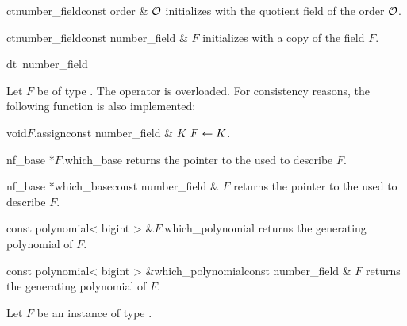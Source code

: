 \begin{fcode}{ct}{number_field}{const order & $\mathcal{O}$}
  initializes with the quotient field of the order $\mathcal{O}$.
\end{fcode}

\begin{fcode}{ct}{number_field}{const number_field & $F$}
  initializes with a copy of the field $F$.
\end{fcode}

\begin{fcode}{dt}{{~number_field}}{}
\end{fcode}



\ASGN

Let $F$ be of type .  The operator \code{=} is overloaded.  For consistency
reasons, the following function is also implemented:

\begin{fcode}{void}{$F$.assign}{const number_field & $K$}
  $F \leftarrow K$.
\end{fcode}



\ACCS

\begin{cfcode}{nf_base *}{$F$.which_base}{}
  returns the pointer to the  used to describe $F$.
\end{cfcode}

\begin{fcode}{nf_base *}{which_base}{const number_field & $F$}
  returns the pointer to the  used to describe $F$.
\end{fcode}

\begin{cfcode}{const polynomial< bigint > &}{$F$.which_polynomial}{}
  returns the generating polynomial of $F$.
\end{cfcode}

\begin{fcode}{const polynomial< bigint > &}{which_polynomial}{const number_field & $F$}
  returns the generating polynomial of $F$.
\end{fcode}



\BASIC

Let $F$ be an instance of type .


